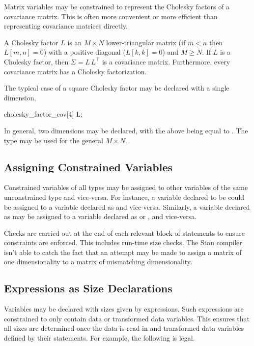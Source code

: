 Matrix variables may be constrained to represent the Cholesky factors
of a covariance matrix.  This is often more convenient or more
efficient than representing covariance matrices directly.

A Cholesky factor $L$ is an $M \times N$ lower-triangular matrix (if
$m < n$ then $L[m,n] =0$) with a positive diagonal ($L[k,k] = 0$) and
$M \geq N$.  If $L$ is a Cholesky factor, then $\Sigma = L \, L^{\top}$
is a covariance matrix.  Furthermore, every covariance matrix has a
Cholesky factorization.

The typical case of a square Cholesky factor may be declared with a
single dimension,
%
\begin{stancode}
cholesky_factor_cov[4] L;
\end{stancode}
%
In general, two dimensions may be declared, with the above being equal to
.  The
type  may be used for the general
$M \times N$.

\subsection{Assigning Constrained Variables}

Constrained variables of all types may be assigned to other variables
of the same unconstrained type and vice-versa.  For instance, a
variable declared to be  could be assigned
to a variable declared as  and vice-versa.  Similarly, a
variable declared as  may be assigned to a variable
declared as  or
, and vice-versa.

Checks are carried out at the end of each relevant block of statements
to ensure constraints are enforced.  This includes run-time size
checks.  The Stan compiler isn't able to catch the fact that an
attempt may be made to assign a matrix of one dimensionality to a
matrix of mismatching dimensionality.


\subsection{Expressions as Size Declarations}

Variables may be declared with sizes given by expressions.  Such
expressions are constrained to only contain data or transformed data
variables.  This ensures that all sizes are determined once the data
is read in and transformed data variables defined by their statements.
For example, the following is legal.
%
\begin{stancode}
data {
  int<lower=0> N_observed;    int<lower=0> N_missing;
  // ...
transformed parameters {
  vector[N_observed + N_missing] y;
  // ...
\end{stancode}

